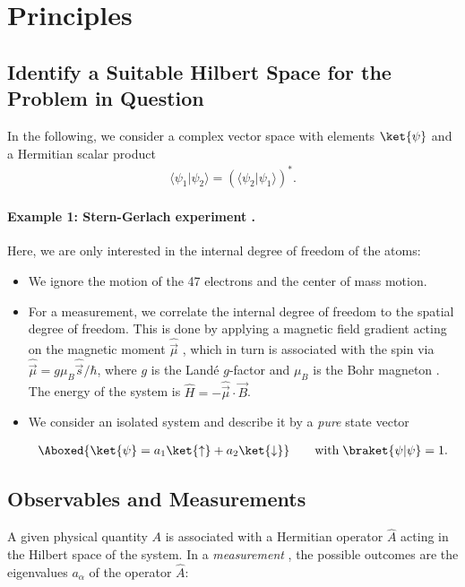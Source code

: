 \section{Principles}

\subsection{Identify a Suitable Hilbert Space for the Problem in Question}

In the following, we consider a complex vector space with elements $\ket{\psi}$ and a Hermitian scalar product
\begin{align}
				\langle{\psi_1}|\psi_2\rangle=(\langle{\psi_2}| \psi_1\rangle)^*.
\end{align}
\paragraph{Example 1: Stern-Gerlach experiment .}

Here, we are only interested in the internal degree of freedom of the  atoms:

\begin{itemize}
						\item 	We ignore the motion of the 47 electrons and the center of mass motion.
						\item 	For a measurement, we correlate the internal degree of freedom to the spatial degree of freedom. This is done by applying a magnetic field gradient acting on the magnetic moment $\hat{\vec{\mu}}$ , which in turn is associated with the spin via $\hat{\vec{\mu}} = g \mu_B \hat{\vec{s}}/\hbar$, where $g$ is the Landé $g$-factor  and $\mu_B$ is the Bohr magneton . The energy of the system is $\hat{H} = -\hat{\vec{\mu}} \cdot \vec{B}$.
						\item 	We consider an isolated system and describe it by a \emph{pure} state vector

\begin{align}
							\Aboxed{\ket{\psi} = a_1 \ket{\uparrow} + a_2 \ket{\downarrow}}  \qquad \text{with} \; \braket{\psi | \psi} = 1.
						
\end{align}
					
\end{itemize}

\subsection{Observables and Measurements}
			A given physical quantity $A$ is associated with a Hermitian operator $\hat{A}$  acting in the Hilbert space  of the system.
						In a \emph{measurement} , the possible outcomes are the eigenvalues $a_\alpha$  of the operator $\hat{A}$:

